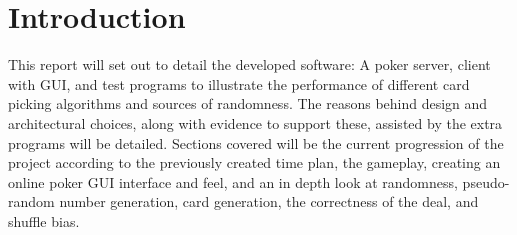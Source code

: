 \section{Introduction}
This report will set out to detail the developed software: A poker server,
client with GUI, and test programs to illustrate the performance of different
card picking algorithms and sources of randomness. The reasons behind design
and architectural choices, along with evidence to support these, assisted by
the extra programs will be detailed. Sections covered will be the current
progression of the project according to the previously created time plan, the
gameplay, creating an online poker GUI interface and feel, and an in depth
look at randomness, pseudo-random number generation, card generation, the
correctness of the deal, and shuffle bias.
